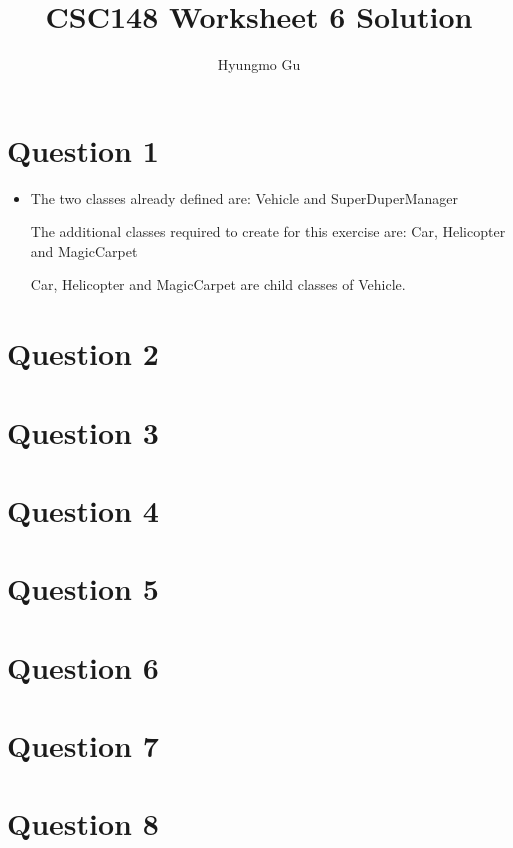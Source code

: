 \documentclass[12pt]{article}
\begin{document}
\title{CSC148 Worksheet 6 Solution}
\author{Hyungmo Gu}
\maketitle

\section*{Question 1}
\begin{itemize}
    \item

    The two classes already defined are: Vehicle and SuperDuperManager

    \bigskip

    The additional classes required to create for this exercise are: Car,
    Helicopter and MagicCarpet

    \bigskip

    Car, Helicopter and MagicCarpet are child classes of Vehicle.

\end{itemize}

\section*{Question 2}

\section*{Question 3}

\section*{Question 4}

\section*{Question 5}

\section*{Question 6}

\section*{Question 7}

\section*{Question 8}
\end{document}
